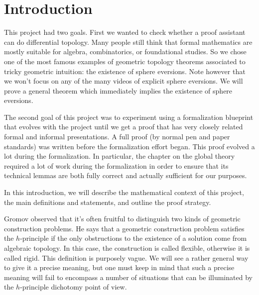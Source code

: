 \chapter*{Introduction}
\label{cha:intro}

This project had two goals. First we wanted to check whether a proof
assistant can do differential topology. Many people still think that
formal mathematics are mostly suitable for algebra, combinatorics, or
foundational studies. So we chose one of the most famous examples
of geometric topology theorems associated to tricky geometric intuition:
the existence of sphere eversions. Note however that we won't focus on
any of the many videos of explicit sphere eversions. We will prove a
general theorem which immediately implies the existence of sphere
eversions.

The second goal of this project was to experiment using a formalization
blueprint that evolves with the project until we get a proof that has
very closely related formal and informal presentations. A full proof (by
normal pen and paper standards) was written before the formalization
effort began. This proof evolved a lot during the formalization. In
particular, the chapter on the global theory required a lot of work
during the formalization in order to ensure that its technical lemmas
are both fully correct and actually sufficient for our purposes.

In this introduction, we will describe the mathematical context of this
project, the main definitions and statements, and outline the proof
strategy.

Gromov observed that it's often fruitful to distinguish two kinds of geometric
construction problems. He says that a geometric construction problem satisfies
the $h$-principle if the only obstructions to the existence of a solution come
from algebraic topology. In this case, the construction is called flexible,
otherwise it is called rigid. This definition is purposely vague. We
will see a rather general way to give it a precise meaning, but one must keep
in mind that such a precise meaning will fail to encompass a number of
situations that can be illuminated by the $h$-principle dichotomy point of view.

